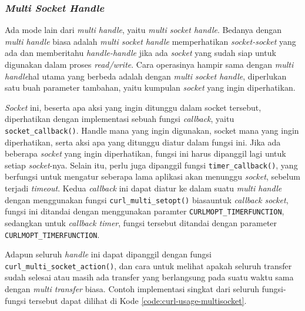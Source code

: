 \subsubsection{\textit{Multi Socket Handle}}
\label{sec:cmodules-libcurl-handlemultisocket}

Ada mode lain dari \textit{multi handle}, yaitu \textit{multi socket handle}. Bedanya dengan \textit{multi handle} biasa adalah \textit{multi socket handle} memperhatikan \textit{socket-socket} yang ada dan memberitahu \textit{handle-handle} jika ada \textit{socket} yang sudah siap untuk digunakan dalam proses \textit{read/write}. Cara operasinya hampir sama dengan \textit{multi handle}\textemdash hal utama yang berbeda adalah dengan \textit{multi socket handle}, diperlukan satu buah parameter tambahan, yaitu kumpulan \textit{socket} yang ingin diperhatikan.

\textit{Socket} ini, beserta apa aksi yang ingin ditunggu dalam socket tersebut, diperhatikan dengan implementasi sebuah fungsi \textit{callback}, yaitu \verb|socket_callback()|. Handle mana yang ingin digunakan, socket mana yang ingin diperhatikan, serta aksi apa yang ditunggu diatur dalam fungsi ini. Jika ada beberapa \textit{socket} yang ingin diperhatikan, fungsi ini harus dipanggil lagi untuk setiap \textit{socket}-nya. Selain itu, perlu juga dipanggil fungsi \verb|timer_callback()|, yang berfungsi untuk mengatur seberapa lama aplikasi akan menunggu \textit{socket}, sebelum terjadi \textit{timeout}. Kedua \textit{callback} ini dapat diatur ke dalam suatu \textit{multi handle} dengan menggunakan fungsi \verb|curl_multi_setopt()| biasa\textemdash untuk \textit{callback socket}, fungsi ini ditandai dengan menggunakan paramter \verb|CURLMOPT_TIMERFUNCTION|, sedangkan untuk \textit{callback timer}, fungsi tersebut ditandai dengan parameter \verb|CURLMOPT_TIMERFUNCTION|.

Adapun seluruh \textit{handle} ini dapat dipanggil dengan fungsi \verb|curl_multi_socket_action()|, dan cara untuk melihat apakah seluruh transfer sudah selesai atau masih ada transfer yang berlangsung pada suatu waktu sama dengan \textit{multi transfer} biasa. Contoh implementasi singkat dari seluruh fungsi-fungsi tersebut dapat dilihat di Kode \ref{code:curl-usage-multisocket}.

